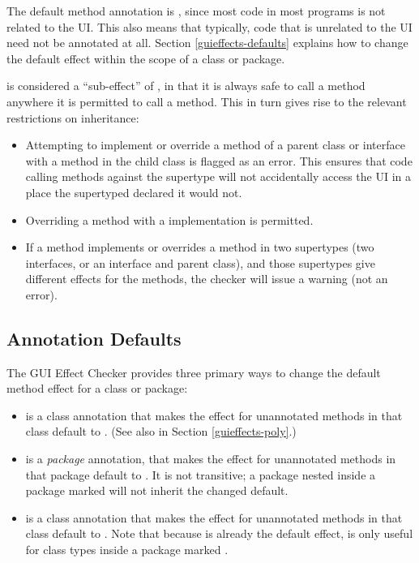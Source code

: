 The default method annotation is , since most code in most programs is not related
to the UI.  This also means that typically, code that is unrelated to the UI need not be annotated
at all.  Section \ref{guieffects-defaults} explains how to change the default effect within the
scope of a class or package.

 is considered a ``sub-effect'' of , in that it is always safe to
call a  method anywhere it is permitted to call a  method.  This
in turn gives rise to the relevant restrictions on inheritance:
\begin{itemize}
\item Attempting to implement or override a  method of a parent class or interface
with a  method in the child class is flagged as an error.  This ensures that
code calling methods against the supertype will not accidentally access the UI in a place the
supertyped declared it would not.
\item Overriding a  method with a  implementation is permitted.
\item If a method implements or overrides a method in two supertypes (two interfaces, or an
interface and parent class), and those supertypes give different effects for the methods, the
checker will issue a warning (not an error).
\end{itemize}

\subsection{Annotation Defaults\label{guieffects-defaults}}
The GUI Effect Checker provides three primary ways to change the default method effect for a class
or package:
\begin{itemize}
\item {} is a class annotation that makes the effect for unannotated methods in that
class default to
.  (See also  in Section \ref{guieffects-poly}.)
\item {} is a \emph{package} annotation, that makes the effect for unannotated
methods in that package default to .  It is not transitive; a package nested inside
a package marked  will not inherit the changed default.
\item {} is a class annotation that makes the effect for unannotated methods in that
class default to .  Note that because  is already the default
effect,  is only useful for class types inside a package marked .
\end{itemize}

